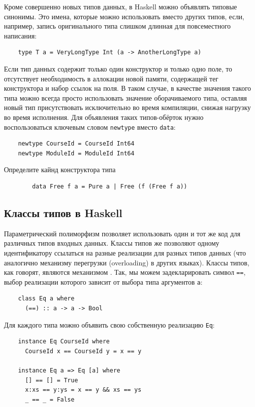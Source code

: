 Кроме совершенно новых типов данных, в Haskell можно объявлять типовые синонимы.
Это имена, которые можно использовать вместо других типов, если, например, запись оригинального типа слишком длинная для повсеместного написания:
\begin{verbatim}
    type T a = VeryLongType Int (a -> AnotherLongType a)
\end{verbatim}

Если тип данных содержит только один конструктор и только одно поле, то отсутствует необходимость в аллокации новой памяти, содержащей тег конструктора и набор ссылок на поля.
В таком случае, в качестве значения такого типа можно всегда просто использовать значение оборачиваемого типа, оставляя новый тип присутствовать исключительно во время компиляции, снижая нагрузку во время исполнения.
Для объявления таких типов-обёрток нужно воспользоваться ключевым словом \texttt{newtype} вместо \texttt{data}:
\begin{verbatim}
    newtype CourseId = CourseId Int64
    newtype ModuleId = ModuleId Int64
\end{verbatim}

\begin{task}
    Определите кайнд конструктора типа
    \begin{verbatim}
        data Free f a = Pure a | Free (f (Free f a))
    \end{verbatim}
\end{task}

\subsection{Классы типов в Haskell}

Параметрический полиморфизм позволяет использовать один и тот же код для различных типов входных данных.
Классы типов же позволяют одному идентификатору ссылаться на разные реализации для разных типов данных (что аналогично механизму перегрузки (overloading) в других языках).
Классы типов, как говорят, являются механизмом .
Так, мы можем задекларировать символ \texttt{==}, выбор реализации которого зависит от выбора типа аргументов \texttt{a}:
\begin{verbatim}
    class Eq a where
      (==) :: a -> a -> Bool
\end{verbatim}

Для каждого типа можно объявить свою собственную реализацию \texttt{Eq}:
\begin{verbatim}
    instance Eq CourseId where
      CourseId x == CourseId y = x == y

    instance Eq a => Eq [a] where
      [] == [] = True
      x:xs == y:ys = x == y && xs == ys
      _ == _ = False
\end{verbatim}

